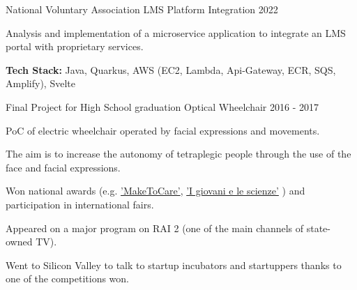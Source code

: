 

\begin{cventries}

  \cventry
    {National Voluntary Association} %
    {LMS Platform Integration} %
    {} %
    {2022} %
    {
      \begin{cvitems} %
        \item {Analysis and implementation of a microservice application to integrate an LMS portal with proprietary services.}
        \item {\textbf{Tech Stack:} Java, Quarkus, AWS (EC2, Lambda, Api-Gateway, ECR, SQS, Amplify), Svelte}
      \end{cvitems}
    }

  \cventry
    {Final Project for High School graduation} %
    {Optical Wheelchair} %
    {} %
    {2016 - 2017} %
    {
      \begin{cvitems} %
        \item {PoC of electric wheelchair operated by facial expressions and movements.}
        \item {The aim is to increase the autonomy of tetraplegic people through the use of the face and facial expressions.}
        \item {Won national awards (e.g. 
            \hyperlink{https://www.maketocare.it/}{'MakeToCare'},
            \hyperlink{https://fast.mi.it/i-giovani-e-le-scienze/}{'I giovani e le scienze'}
            ) and participation in international fairs.}
        \item {Appeared on a major program on RAI 2 (one of the main channels of state-owned TV).}
        \item {Went to Silicon Valley to talk to startup incubators and startuppers thanks to one of the competitions won.}
      \end{cvitems}
    }


\end{cventries}
